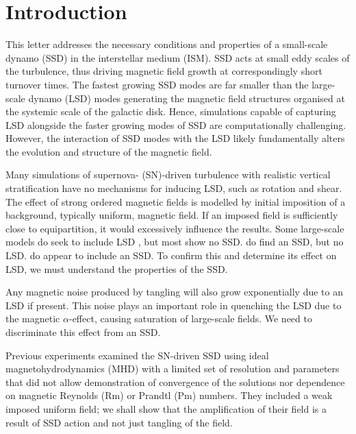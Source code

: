 \documentclass[preprint2]{aastex63}
\begin{document}
\section{Introduction}\label{sec:intro}


 This letter addresses the necessary conditions and properties of a small-scale
 dynamo (SSD) in the interstellar medium (ISM).
 SSD acts at small eddy scales of the turbulence, thus driving magnetic field
 growth at correspondingly short turnover times.
 The fastest growing SSD modes are far smaller than the large-scale dynamo
 (LSD) modes generating the magnetic field structures organised at the systemic
 scale of the galactic disk.
 Hence, simulations capable of capturing LSD alongside the faster growing modes
 of SSD are computationally challenging.
 However, the interaction of SSD modes with the LSD likely fundamentally alters
 the evolution and structure of the magnetic field.

 Many simulations of supernova- (SN)-driven turbulence with realistic vertical
 stratification \citep[e.g.,][]{deAvillez:2005,PO07,Hill:2012a,HI14} have no
 mechanisms for inducing LSD, such as rotation and shear.
 The effect of strong ordered magnetic fields is modelled by initial
 imposition of a background, typically uniform, magnetic field.
 If an imposed field is sufficiently close to equipartition, it
 would excessively influence the results.
 Some large-scale models do seek to include LSD \citep[e.g.,][]{Korpi:1999b,
 Gressel:2008,HWK09,WA09,FCSBKS11,FSBS14,RT16,RT17,RT17a,Pakmor17,SBADMN19,GE20}, but most show no SSD.
 \citet{RT16,SBADMN19} do find an SSD, but no LSD.
 \citet{Gent:2013b,EGSFB16} do appear to include an SSD.
 To confirm this and determine its effect on LSD, we must understand the
 properties of the SSD.
     
 Any magnetic noise produced by tangling will also grow exponentially due to
 an LSD if present.
 This noise plays an important role in quenching the LSD due to the magnetic
 $\alpha$-effect, causing saturation of large-scale fields.
 We need to discriminate this effect from an SSD.   

 Previous experiments \citep[e.g.,][]{BKMM04,BalKim05,MacLow:2005}
 examined the SN-driven SSD using ideal magnetohydrodynamics (MHD) with
 a limited set of resolution and parameters that did not allow
 demonstration of convergence of the solutions nor dependence on
 magnetic Reynolds (Rm) or Prandtl (Pm) numbers.
 They included a weak imposed uniform field; we shall show
 that the amplification of their field is a result
 of SSD action and not just tangling of the field.
\end{document}
